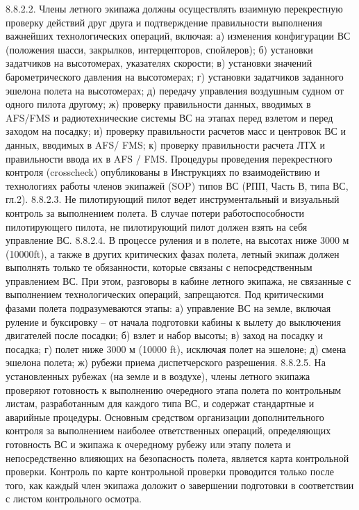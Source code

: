 8.8.2.2. Члены летного экипажа должны осуществлять взаимную перекрестную проверку действий друг друга и подтверждение правильности выполнения важнейших технологических операций, включая:
а)	изменения конфигурации ВС (положения шасси, закрылков, интерцепторов, спойлеров);
б)	установки задатчиков на высотомерах, указателях скорости;
в)	установки значений барометрического давления на высотомерах;
г)	установки задатчиков заданного эшелона полета на высотомерах;
д)	передачу управления воздушным судном от одного пилота другому;
ж) проверку правильности данных, вводимых в AFS/FMS и радиотехнические системы ВС на этапах перед взлетом и перед заходом на посадку;
и) проверку правильности расчетов масс и центровок ВС и данных, вводимых в AFS/ FMS;
к) проверку правильности расчета ЛТХ и правильности ввода их в AFS / FMS.
Процедуры проведения перекрестного контроля (crosscheck) опубликованы в Инструкциях по взаимодействию и технологиях работы членов экипажей (SOP) типов ВС (РПП, Часть В, типа ВС, гл.2).
8.8.2.3. Не пилотирующий пилот ведет инструментальный и визуальный контроль за выполнением полета. В случае потери работоспособности пилотирующего пилота, не пилотирующий пилот должен взять на себя управление ВС. 
8.8.2.4. В процессе руления и в полете, на высотах ниже 3000 м (10000ft), а также в других критических фазах полета, летный экипаж должен выполнять только те обязанности, которые связаны с непосредственным управлением ВС. 
При этом, разговоры в кабине летного экипажа, не связанные с выполнением технологических операций, запрещаются. 
Под критическими фазами полета подразумеваются этапы:
а)	управление ВС на земле, включая руление и буксировку – от начала подготовки кабины к вылету до выключения двигателей после посадки;
б)	взлет и набор высоты;
в)	заход на посадку и посадка;
г)	полет ниже 3000 м (10000 ft), исключая полет на эшелоне;
д)	смена эшелона полета;
ж)	рубежи приема диспетчерского разрешения. 
8.8.2.5. На установленных рубежах (на земле и в воздухе), члены летного экипажа проверяют готовность к выполнению очередного этапа полета по контрольным листам, разработанным для каждого типа ВС, и содержат стандартные и аварийные процедуры. 
Основным средством организации дополнительного контроля за выполнением наиболее ответственных операций, определяющих готовность ВС и экипажа к очередному рубежу или этапу полета и непосредственно влияющих на безопасность полета, является карта контрольной проверки.
Контроль по карте контрольной проверки проводится только после того, как каждый член экипажа доложит о завершении подготовки в соответствии с листом контрольного осмотра.
